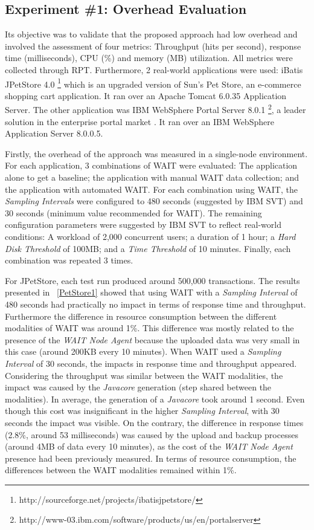 \documentclass[runningheads,a4paper]{llncs}
\begin{document}
\vspace{-5pt}
\subsection{Experiment \#1: Overhead Evaluation}
\vspace{-2pt}
Its objective was to validate that the proposed approach had low overhead and
involved the assessment of four metrics: Throughput (hits per second), response
time (milliseconds), CPU (\%) and memory (MB) utilization. All metrics were
collected through RPT. Furthermore, 2 real-world applications were used: iBatis JPetStore
4.0 \footnote{http://sourceforge.net/projects/ibatisjpetstore/} which is an upgraded
version of Sun's Pet Store, an e-commerce shopping cart application. It ran over
an Apache Tomcat 6.0.35 Application Server. The other application was IBM
WebSphere Portal Server 8.0.1 \footnote{http://www-03.ibm.com/software/products/us/en/portalserver},
a leader solution in the enterprise portal market \cite{Gartner2008}. It ran
over an IBM WebSphere Application Server 8.0.0.5.

Firstly, the overhead of the approach was measured in a single-node environment.
For each application, 3 combinations of WAIT were evaluated: The application
alone to get a baseline; the application with manual WAIT data collection;
and the application with automated WAIT. For each combination using WAIT, the
\emph{Sampling Intervals} were configured to 480 seconds (suggested by IBM SVT)
and 30 seconds (minimum value recommended for WAIT). The remaining configuration
parameters were suggested by IBM SVT to reflect real-world conditions:
A workload of 2,000 concurrent users; a duration of 1 hour; a \emph{Hard Disk
Threshold} of 100MB; and a \emph{Time Threshold} of 10 minutes. Finally, each
combination was repeated 3 times.

For JPetStore, each test run produced around 500,000 transactions. The results
presented in \tablename ~\ref{PetStore1} showed that using WAIT with a
\emph{Sampling Interval} of 480 seconds had practically no impact in terms of
response time and throughput. Furthermore the difference in resource consumption
between the different modalities of WAIT was around 1\%.  This difference was
mostly related to the presence of the \emph{WAIT Node Agent} because the
uploaded data was very small in this case (around 200KB every 10 minutes). When
WAIT used a \emph{Sampling Interval} of 30 seconds, the impacts in response time
and throughput appeared. Considering the throughput was similar between
the WAIT modalities, the impact was caused by the \emph{Javacore} generation
(step shared between the modalities). In average, the generation of a
\emph{Javacore} took around 1 second. Even though this cost was insignificant in the higher
\emph{Sampling Interval}, with 30 seconds the impact was visible. On the contrary, 
the difference in response times (2.8\%, around 53 milliseconds) was caused
by the upload and backup processes (around 4MB of data every 10 minutes), as the
cost of the \emph{WAIT Node Agent} presence had been previously measured. In
terms of resource consumption, the differences between the WAIT
modalities remained within 1\%.
\end{document}
